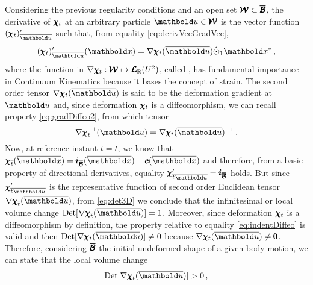 Considering the previous regularity conditions and an open set $\pmb{\mathcal{W}}\subset\pmb{\overline{\mathcal{B}}}$, the derivative of $\pmb{\chi}_t$ at an arbitrary particle $\overline{\vto{u}}\in\pmb{\mathcal{W}}$ is the vector function $(\tnr{\chi}_t)'_{\overline{\vto{u}}}$ such that, from equality \eqref{eq:derivVecGradVec}, 
\begin{equation}
\fua{(\tnr{\chi}_t)'_{\overline{\vto{u}}}}{\vto{x}}= \fua{ \nabla\tnr{\chi}_t}{\overline{\vto{u}}}\hat{\odot}_1\vto{x}^*\,,
\end{equation}
where the function in $\nabla\pmb{\chi}_t : \pmb{\mathcal{W}} \mapsto \pmb{\mathcal{L}}_{\mathbb{R}}(U^{2})$, called , has fundamental importance in Continuum Kinematics because it bases the concept of strain. The second order tensor $\fua{ \nabla\tnr{\chi}_t}{\overline{\vto{u}}}$ is said to be the deformation gradient at $\overline{\vto{u}}$ and, since deformation $\pmb{\chi}_t$ is a diffeomorphism, we can recall property \eqref{eq:gradDiffeo2}, from which tensor
\begin{equation}\label{eq:invGradDef}
\fua{\nabla\tnr{\chi}_t^{-1}}{\vto{u}} = \fua{\nabla\tnr{\chi}_t}{\overline{\vto{u}}}^{-1}\,.
\end{equation}
Now, at reference instant $t=\overline{t}$, we know that $\tnr{\chi}_{\overline{t}}(\overline{\vto{x}})=\tnr{i}_{\tnr{\overline{\mathcal{B}}}}(\overline{\vto{x}})+\fua{\vtf{c}}{\overline{\vto{x}}}$ and therefore, from a basic property of directional derivatives, equality ${\tnr{\chi}'_{\overline{t}} }_{\overline{\vto{u}}}=\tnr{i}_{\tnr{\overline{\mathcal{B}}}}$ holds. But since ${\tnr{\chi}'_{\overline{t}} }_{\overline{\vto{u}}}$ is the representative function of second order Euclidean tensor $\fua{\nabla\tnr{\chi}_{\overline{t}}}{\overline{\vto{u}}}$, from \eqref{eq:det3D} we conclude that the infinitesimal or local volume change $\textnormal{Det}[\fua{\nabla\tnr{\chi}_{\overline{t}}}{\overline{\vto{u}}}]=1$. Moreover, since deformation $\pmb{\chi}_{t}$ is a diffeomorphism by definition, the property relative to equality \eqref{eq:indentDiffeo} is valid and then $\textnormal{Det}[\fua{\nabla\tnr{\chi}_{t}}{\overline{\vto{u}}}]\neq 0$ because $\fua{\nabla\tnr{\chi}_{t}}{\overline{\vto{u}}}\neq \tnr{0}$. Therefore, considering $\pmb{\overline{\mathcal{B}}}$ the initial undeformed shape of a given body motion, we can state that the local volume change       
\begin{equation}\label{eq:detPositive}
\textnormal{Det}[\fua{\nabla\tnr{\chi}_t}{\overline{\vto{u}}}]>0\,,
\end{equation}
